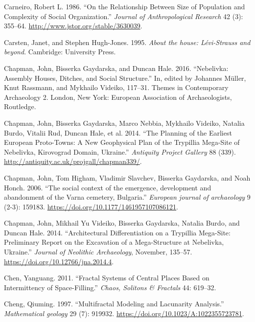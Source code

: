 \documentclass[
  12pt,
  a4paper, twoside]{book}
\newlength{\cslhangindent}
\newlength{\cslentryspacingunit} %
\newenvironment{CSLReferences}[2] %
 {%
  \setlength{\parindent}{0pt}
  \ifodd #1
  \let\oldpar\par
  \def\par{\hangindent=\cslhangindent\oldpar}
  \fi
  \setlength{\parskip}{#2\cslentryspacingunit}
 }%
 {}
\begin{document}
\begin{CSLReferences}{1}{0}
\leavevmode{}%
Carneiro, Robert L. 1986. {``On the Relationship Between Size of Population and Complexity of Social Organization.''} \emph{Journal of Anthropological Research} 42 (3): 355--64. \url{http://www.jstor.org/stable/3630039}.

\leavevmode{}%
Carsten, Janet, and Stephen Hugh-Jones. 1995. \emph{About the house: Lévi-Strauss and beyond}. Cambridge: University Press.

\leavevmode{}%
Chapman, John, Bisserka Gaydarska, and Duncan Hale. 2016. {``Nebelivka: Assembly Houses, Ditches, and Social Structure.''} In, edited by Johannes Müller, Knut Rassmann, and Mykhailo Videiko, 117--31. Themes in Contemporary Archaeology 2. London, New York: European Association of Archaeologists, Routledge.

\leavevmode{}%
Chapman, John, Bisserka Gaydarska, Marco Nebbia, Mykhailo Videiko, Natalia Burdo, Vitalii Rud, Duncan Hale, et al. 2014. {``The Planning of the Earliest European Proto-Towns: A New Geophysical Plan of the Trypillia Mega-Site of Nebelivka, Kirovograd Domain, Ukraine.''} \emph{Antiquity Project Gallery} 88 (339). \url{http://antiquity.ac.uk/projgall/chapman339/}.

\leavevmode{}%
Chapman, John, Tom Higham, Vladimir Slavchev, Bisserka Gaydarska, and Noah Honch. 2006. {``The social context of the emergence, development and abandonment of the Varna cemetery, Bulgaria.''} \emph{European journal of archaeology} 9 (2-3): 159183. \url{https://doi.org/10.1177/1461957107086121}.

\leavevmode{}%
Chapman, John, Mikhail Yu Videiko, Bisserka Gaydarska, Natalia Burdo, and Duncan Hale. 2014. {``Architectural Differentiation on a Trypillia Mega-Site: Preliminary Report on the Excavation of a Mega-Structure at Nebelivka, Ukraine.''} \emph{Journal of Neolithic Archaeology}, November, 135--57. \url{https://doi.org/10.12766/jna.2014.4}.

\leavevmode{}%
Chen, Yanguang. 2011. {``Fractal Systems of Central Places Based on Intermittency of Space-Filling.''} \emph{Chaos, Solitons \& Fractals} 44: 619--32.

\leavevmode{}%
Cheng, Qiuming. 1997. {``Multifractal Modeling and Lacunarity Analysis.''} \emph{Mathematical geology} 29 (7): 919932. \url{https://doi.org/10.1023/A:1022355723781}.


\end{CSLReferences}
\end{document}
